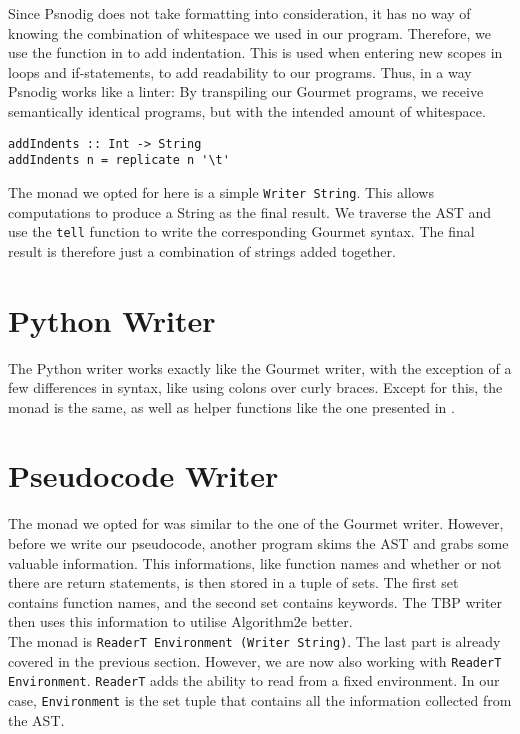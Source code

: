 Since Psnodig does not take formatting into consideration, it has no way of knowing the combination of whitespace we used in our program. Therefore, we use the function in  to add indentation. This is used when entering new scopes in loops and if-statements, to add readability to our programs. Thus, in a way Psnodig works like a linter: By transpiling our Gourmet programs, we receive semantically identical programs, but with the intended amount of whitespace. \\

\begin{lstlisting}[caption={A function for adding indentation.}, captionpos=b, label={helperFunc}]
addIndents :: Int -> String
addIndents n = replicate n '\t'
\end{lstlisting}

The monad we opted for here is a simple \texttt{Writer String}. This allows computations to produce a String as the final result. We traverse the AST and use the \texttt{tell} function to write the corresponding Gourmet syntax. The final result is therefore just a combination of strings added together.

\section{Python Writer}

The Python writer works exactly like the Gourmet writer, with the exception of a few differences in syntax, like using colons over curly braces. Except for this, the monad is the same, as well as helper functions like the one presented in .

\section{Pseudocode Writer}

The monad we opted for was similar to the one of the Gourmet writer. However, before we write our pseudocode, another program skims the AST and grabs some valuable information. This informations, like function names and whether or not there are return statements, is then stored in a tuple of sets. The first set contains function names, and the second set contains keywords. The TBP writer then uses this information to utilise Algorithm2e better. \\

The monad is \texttt{ReaderT Environment (Writer String)}. The last part is already covered in the previous section. However, we are now also working with \texttt{ReaderT Environment}. \texttt{ReaderT} adds the ability to read from a fixed environment. In our case, \texttt{Environment} is the set tuple that contains all the information collected from the AST.


